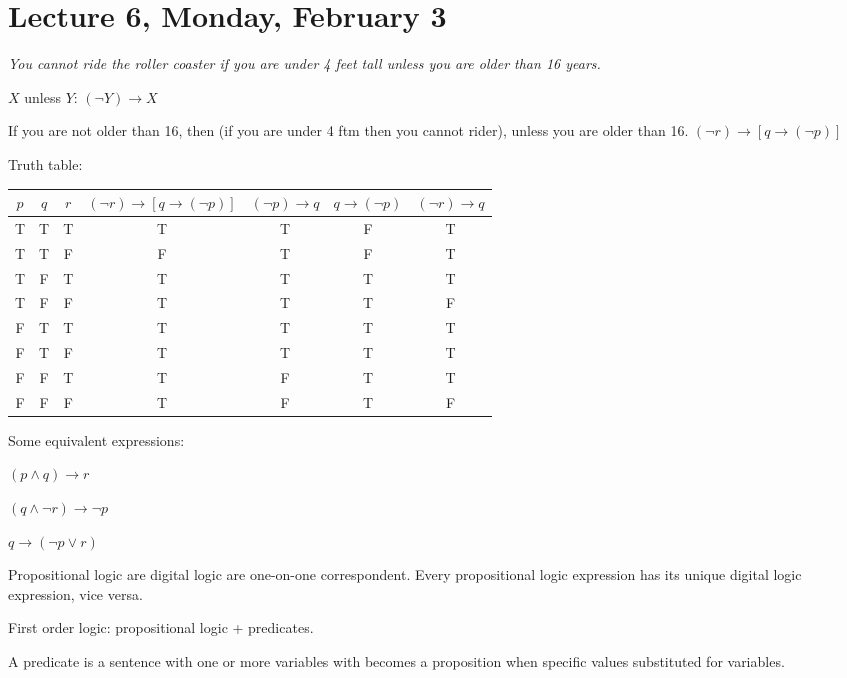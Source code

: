 \section{Lecture 6, Monday, February 3}

\begin{ex}

\textit{You cannot ride the roller coaster if you are under 4 feet tall unless you are older than 16 years.}

$X$ unless $Y$: $(\lnot Y) \rightarrow X$

If you are not older than 16, then (if you are under 4 ftm then you cannot rider), unless you are older than 16. $(\lnot r) \rightarrow \left [ q \rightarrow ( \lnot p ) \right ]$

Truth table:

\begin{tabular}{ccc|c|c|c|c}
$p$ & $q$ & $r$ & $(\lnot r) \rightarrow \left [ q \rightarrow ( \lnot p ) \right ]$ & $(\lnot p) \rightarrow q$ & $q \rightarrow (\lnot p)$ & $(\lnot r) \rightarrow q$\\\hline
 T  &  T  &  T  &  T  &  T  &  F  &  T\\
 T  &  T  &  F  &  F  &  T  &  F  &  T\\
 T  &  F  &  T  &  T  &  T  &  T  &  T\\
 T  &  F  &  F  &  T  &  T  &  T  &  F\\
 F  &  T  &  T  &  T  &  T  &  T  &  T\\
 F  &  T  &  F  &  T  &  T  &  T  &  T\\
 F  &  F  &  T  &  T  &  F  &  T  &  T\\
 F  &  F  &  F  &  T  &  F  &  T  &  F
\end{tabular}

Some equivalent expressions:

$(p \land q ) \rightarrow r$

$(q \land \lnot r) \rightarrow \lnot p$

$q \rightarrow (\lnot p \lor r)$

\end{ex}

Propositional logic are digital logic are one-on-one correspondent. Every propositional logic expression has its unique digital logic expression, vice versa. 

First order logic: propositional logic + predicates.

\begin{defn}

A predicate is a sentence with one or more variables with becomes a proposition when specific values substituted for variables.

\end{defn}

